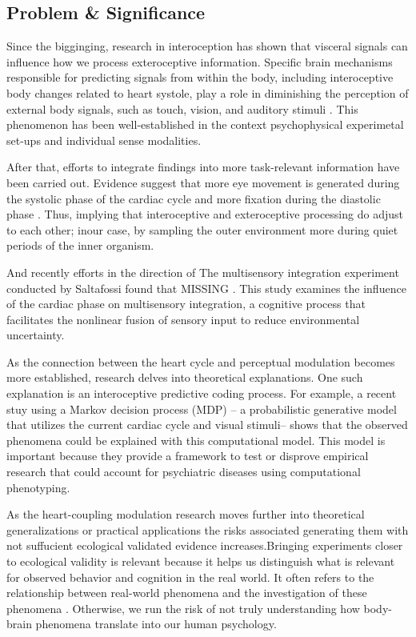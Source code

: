 \documentclass[12pt,oneside,openright]{report}
\begin{document}
\subsection*{Problem \& Significance}

Since the bigginging, research in interoception has shown that visceral signals can influence how we process exteroceptive information. Specific brain mechanisms responsible for predicting signals from within the body, including interoceptive body changes related to heart systole, play a role in diminishing the perception of external body signals, such as touch, vision, and auditory stimuli \parencite{esra_p, AL2021118247, Grund643, motyka, Park2014}. This phenomenon has been well-established in the context psychophysical experimetal set-ups and individual sense modalities.

After that, efforts to integrate findings into more task-relevant information have been carried out. Evidence suggest that more eye movement is generated during the systolic phase of the cardiac cycle and more fixation during the diastolic phase \parencite{GalvezPol2018ActiveSI}. Thus, implying that interoceptive and exteroceptive processing do adjust to each other; inour case, by sampling the outer environment more during quiet periods of the inner organism.

And recently efforts in the direction of The multisensory integration experiment conducted by Saltafossi found that MISSING \parencite{SALTAFOSSI2023108642}. This study examines the influence of the cardiac phase on multisensory integration, a cognitive process that facilitates the nonlinear fusion of sensory input to reduce environmental uncertainty.

As the connection between the heart cycle and perceptual modulation becomes more established, research delves into theoretical explanations. One such explanation is an interoceptive predictive coding process. For example, a recent stuy \parencite{Allen2022}using a Markov decision process (MDP) -- a probabilistic generative model that utilizes the current cardiac cycle and visual stimuli-- shows that the observed phenomena could be explained with this computational model. This model is important because they provide a framework to test or disprove empirical research that could account for psychiatric diseases using computational phenotyping. 

As the heart-coupling modulation research moves further into theoretical generalizations or practical applications the risks associated generating them with not suffucient ecological validated evidence increases.Bringing experiments closer to ecological validity is relevant because it helps us distinguish what is relevant for observed behavior and cognition in the real world. It often refers to the relationship between real-world phenomena and the investigation of these phenomena \parencite{schmuckler2001ecological}. Otherwise, we run the risk of not truly understanding how body-brain phenomena translate into our human psychology.
\end{document}
